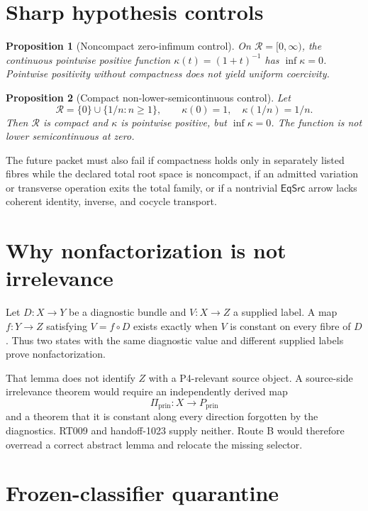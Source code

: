 \documentclass[11pt]{article}
\newtheorem{proposition}{Proposition}
\newcommand{\EqSrc}{\mathsf{EqSrc}}
\begin{document}
\section{Sharp hypothesis controls}

\begin{proposition}[Noncompact zero-infimum control]
On \(\mathcal R=[0,\infty)\), the continuous pointwise positive function
\(\kappa(t)=(1+t)^{-1}\) has \(\inf\kappa=0\).  Pointwise positivity without
compactness does not yield uniform coercivity.
\end{proposition}

\begin{proposition}[Compact non-lower-semicontinuous control]
Let
\[
 \mathcal R=\{0\}\cup\{1/n:n\geq1\},\qquad
 \kappa(0)=1,\quad \kappa(1/n)=1/n.
\]
Then \(\mathcal R\) is compact and \(\kappa\) is pointwise positive, but
\(\inf\kappa=0\).  The function is not lower semicontinuous at zero.
\end{proposition}

The future packet must also fail if compactness holds only in separately
listed fibres while the declared total root space is noncompact, if an
admitted variation or transverse operation exits the total family, or if a
nontrivial \(\EqSrc\) arrow lacks coherent identity, inverse, and cocycle
transport.

\section{Why nonfactorization is not irrelevance}

Let \(D:X\to Y\) be a diagnostic bundle and \(V:X\to Z\) a supplied label.
A map \(f:Y\to Z\) satisfying \(V=f\circ D\) exists exactly when \(V\) is
constant on every fibre of \(D\).  Thus two states with the same diagnostic
value and different supplied labels prove nonfactorization.

That lemma does not identify \(Z\) with a P4-relevant source object.  A
source-side irrelevance theorem would require an independently derived map
\[
  \Pi_{\mathrm{prin}}:X\longrightarrow P_{\mathrm{prin}}
\]
and a theorem that it is constant along every direction forgotten by the
diagnostics.  RT009 and handoff-1023 supply neither.  Route B would therefore
overread a correct abstract lemma and relocate the missing selector.

\section{Frozen-classifier quarantine}
\end{document}
